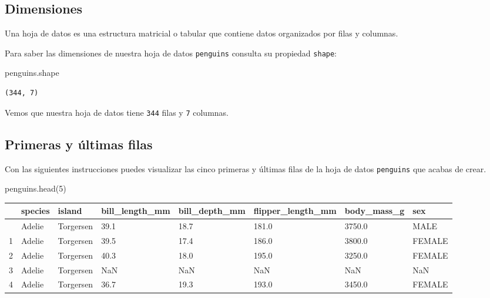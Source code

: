 \documentclass[
  a4paper,
  noprof,
  12pt,
  notoc,
  nosols,
  nobib]{mnye}
\newenvironment{Shaded}{\begin{snugshade}}{\end{snugshade}}
\newcommand{\DecValTok}[1]{\textcolor[rgb]{0.68,0.00,0.00}{#1}}
\newcommand{\NormalTok}[1]{\textcolor[rgb]{0.00,0.23,0.31}{#1}}
\theoremstyle{definition}
\theoremstyle{remark}
\begin{document}
\subsection{Dimensiones}\label{dimensiones}

Una hoja de datos es una estructura matricial o tabular que contiene
datos organizados por filas y columnas.

Para saber las dimensiones de nuestra hoja de datos \texttt{penguins}
consulta su propiedad \texttt{shape}:

\begin{Shaded}
\begin{Highlighting}[]
\NormalTok{penguins.shape}
\end{Highlighting}
\end{Shaded}

\begin{verbatim}
(344, 7)
\end{verbatim}

Vemos que nuestra hoja de datos tiene \texttt{344} filas y \texttt{7}
columnas.

\subsection{Primeras y últimas filas}\label{sec-head-tail}

Con las siguientes instrucciones puedes visualizar las cinco primeras y
últimas filas de la hoja de datos \texttt{penguins} que acabas de crear.

\begin{Shaded}
\begin{Highlighting}[]
\NormalTok{penguins.head(}\DecValTok{5}\NormalTok{)}
\end{Highlighting}
\end{Shaded}

\begin{longtable}[]{@{}llllllll@{}}
\toprule\noalign{}
& species & island & bill\_length\_mm & bill\_depth\_mm &
flipper\_length\_mm & body\_mass\_g & sex \\
\midrule\noalign{}
\endhead
\bottomrule\noalign{}
\endlastfoot
0 & Adelie & Torgersen & 39.1 & 18.7 & 181.0 & 3750.0 & MALE \\
1 & Adelie & Torgersen & 39.5 & 17.4 & 186.0 & 3800.0 & FEMALE \\
2 & Adelie & Torgersen & 40.3 & 18.0 & 195.0 & 3250.0 & FEMALE \\
3 & Adelie & Torgersen & NaN & NaN & NaN & NaN & NaN \\
4 & Adelie & Torgersen & 36.7 & 19.3 & 193.0 & 3450.0 & FEMALE \\
\end{longtable}
\end{document}
